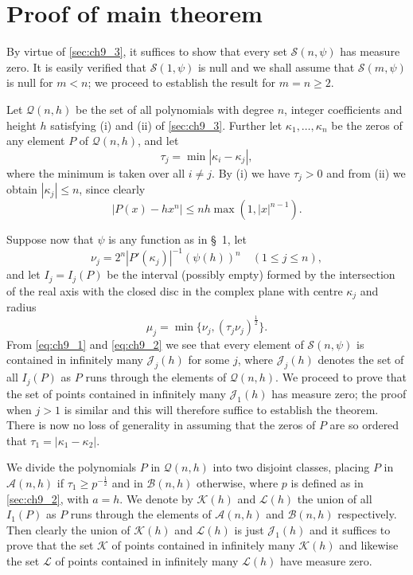 \section{Proof of main theorem}\label{sec:ch9_5}

By virtue of \autoref{sec:ch9_3}, it suffices to show that every set $\mathscr{S}(n, \psi)$ has measure zero. It is easily verified that $\mathscr{S}(1, \psi)$ is null and we shall assume that $\mathscr{S}(m, \psi)$ is null for $m < n$; we proceed to establish the result for $m = n \ge 2$.

Let $\mathscr{Q}(n,h)$ be the set of all polynomials with degree $n$, integer coefficients and height $h$ satisfying (i) and (ii) of \autoref{sec:ch9_3}. Further let $\kappa_1, \ldots, \kappa_n$ be the zeros of any element $P$ of $\mathscr{Q}(n,h)$, and let
\[\tau_j = \min |\kappa_i - \kappa_j|,\]
where the minimum is taken over all $i \neq j$. By (i) we have $\tau_j > 0$ and from (ii) we obtain $|\kappa_j| \leq n$, since clearly
\[|P(x)-hx^n|\leqslant nh\max(1,|x|^{n-1}).\]

Suppose now that $\psi$ is any function as in \S~1, let
\[\nu_j=2^n\left|P'(\kappa_j)\right|^{-1}(\psi(h))^n\quad (1\leqslant j\leqslant n),\]
and let $I_j = I_j(P)$ be the interval (possibly empty) formed by the intersection of the real axis with the closed disc in the complex plane with centre $\kappa_j$ and radius
\[\mu_j = \min \{ \nu_j, (\tau_j \nu_j)^{\frac{1}{2}} \}.\]
From \eqref{eq:ch9_1} and \eqref{eq:ch9_2} we see that every element of $\mathscr{S}(n,\psi)$ is contained in infinitely many $\mathscr{J}_j(h)$ for some $j$, where $\mathscr{J}_j(h)$ denotes the set of all $I_j(P)$ as $P$ runs through the elements of $\mathscr{Q}(n,h)$. We proceed to prove that the set of points contained in infinitely many $\mathscr{J}_1(h)$ has measure zero; the proof when $j > 1$ is similar and this will therefore suffice to establish the theorem. There is now no loss of generality in assuming that the zeros of $P$ are so ordered that $\tau_1 = |\kappa_1 - \kappa_2|$.

We divide the polynomials $P$ in $\mathscr{Q}(n,h)$ into two disjoint classes, placing $P$ in $\mathscr{A}(n,h)$ if $\tau_1 \geq p^{-\frac{1}{2}}$ and in $\mathscr{B}(n,h)$ otherwise, where $p$ is defined as in \autoref{sec:ch9_2}, with $a=h$. We denote by $\mathscr{K}(h)$ and $\mathscr{L}(h)$ the union of all $I_1(P)$ as $P$ runs through the elements of $\mathscr{A}(n,h)$ and $\mathscr{B}(n,h)$ respectively. Then clearly the union of $\mathscr{K}(h)$ and $\mathscr{L}(h)$ is just $\mathscr{J}_1(h)$ and it suffices to prove that the set $\mathscr{K}$ of points contained in infinitely many $\mathscr{K}(h)$ and likewise the set $\mathscr{L}$ of points contained in infinitely many $\mathscr{L}(h)$ have measure zero.

